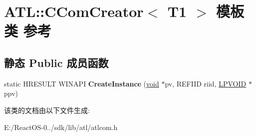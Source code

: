\hypertarget{class_a_t_l_1_1_c_com_creator}{}\section{A\+TL\+:\+:C\+Com\+Creator$<$ T1 $>$ 模板类 参考}
\label{class_a_t_l_1_1_c_com_creator}
\subsection*{静态 Public 成员函数}
\begin{DoxyCompactItemize}
\item 
\mbox{\label{class_a_t_l_1_1_c_com_creator_a3240235ff8bd76ae78b3fc21e92a7a1c}} 
static H\+R\+E\+S\+U\+LT W\+I\+N\+A\+PI {\bfseries Create\+Instance} (\hyperlink{interfacevoid}{void} $\ast$pv, R\+E\+F\+I\+ID riid, \hyperlink{interfacevoid}{L\+P\+V\+O\+ID} $\ast$ppv)
\end{DoxyCompactItemize}


该类的文档由以下文件生成\+:\begin{DoxyCompactItemize}
\item 
E\+:/\+React\+O\+S-\/0../sdk/lib/atl/atlcom.\+h\end{DoxyCompactItemize}
